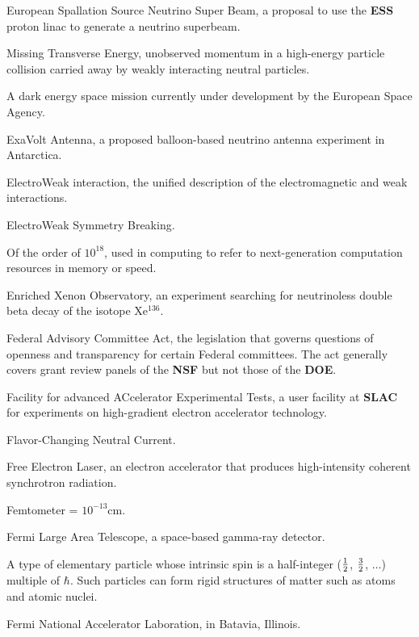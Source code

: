  European Spallation Source Neutrino Super Beam, a
proposal to use the {\bf ESS}  proton linac to generate a neutrino
superbeam.

\glossterm{\boldmath$\ETmiss$}  Missing Transverse Energy, unobserved momentum
in  a  high-energy particle collision carried away by weakly interacting neutral particles.

  A dark energy space mission currently under development by the
European Space Agency.

 ExaVolt Antenna, a proposed balloon-based
 neutrino antenna experiment in Antarctica.

 ElectroWeak interaction, the unified description of 
the electromagnetic and weak interactions.

  ElectroWeak Symmetry Breaking.

  Of the order of $10^{18}$, used in computing to 
 refer to next-generation computation resources in memory or speed.

 Enriched Xenon Observatory, an experiment searching
for neutrinoless double beta decay of the isotope Xe$^{136}$.

  Federal Advisory Committee Act, the legislation that 
governs questions of openness and transparency for certain Federal 
committees.  The act generally covers grant review panels of the {\bf NSF} but not 
those of the {\bf DOE}.

   Facility for advanced ACcelerator Experimental
Tests, a user facility at {\bf SLAC} for experiments on high-gradient 
electron accelerator technology.

 Flavor-Changing Neutral Current.

  Free Electron Laser, an electron accelerator that  produces
high-intensity
    coherent synchrotron radiation.

  Femtometer =  $10^{-13}$cm.

  Fermi Large Area Telescope, a space-based gamma-ray
detector.

 A type of elementary particle whose intrinsic spin is a
half-integer (${1\over 2}$, $ {3\over 2}$, $\ldots$) multiple of $\hbar$.  Such
particles can form rigid structures of matter such as atoms and atomic nuclei.

  Fermi National Accelerator Laboration, in
Batavia, Illinois. 

